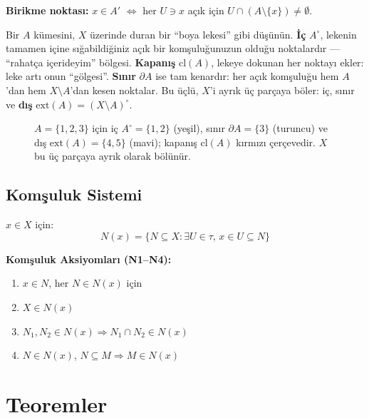 \noindent\textbf{Birikme noktası:} $x \in A'$ $\iff$ her $U \ni x$ açık için
$U \cap (A \setminus \{x\}) \neq \emptyset$.

\begin{sezgi}
Bir $A$ kümesini, $X$ üzerinde duran bir ``boya lekesi'' gibi düşünün.
\textbf{İç} $A^\circ$, lekenin tamamen içine sığabildiğiniz açık bir
komşuluğunuzun olduğu noktalardır --- ``rahatça içerideyim'' bölgesi.
\textbf{Kapanış} $\mathrm{cl}(A)$, lekeye dokunan her noktayı ekler:
leke artı onun ``gölgesi''. \textbf{Sınır} $\partial A$ ise tam kenardır:
her açık komşuluğu hem $A$'dan hem $X\setminus A$'dan kesen noktalar.
Bu üçlü, $X$'i ayrık üç parçaya böler: iç, sınır ve \textbf{dış}
$\mathrm{ext}(A) = (X\setminus A)^\circ$.
\end{sezgi}

\begin{figure}[ht]
  \centering
  
  \caption{$A=\{1,2,3\}$ için iç $A^\circ=\{1,2\}$ (yeşil), sınır
    $\partial A=\{3\}$ (turuncu) ve dış $\mathrm{ext}(A)=\{4,5\}$ (mavi);
    kapanış $\mathrm{cl}(A)$ kırmızı çerçevedir. $X$ bu üç parçaya ayrık olarak bölünür.}
  \label{fig:ch05:ic_kapanis_sinir}
\end{figure}

\subsection{Komşuluk Sistemi}

\begin{definition}
$x \in X$ için:
\[
  N(x) = \{N \subseteq X : \exists U \in \tau,\, x \in U \subseteq N\}
\]
\end{definition}

\noindent\textbf{Komşuluk Aksiyomları (N1--N4):}
\begin{enumerate}
  \item[(N1)] $x \in N$, her $N \in N(x)$ için
  \item[(N2)] $X \in N(x)$
  \item[(N3)] $N_1, N_2 \in N(x) \Rightarrow N_1 \cap N_2 \in N(x)$
  \item[(N4)] $N \in N(x)$, $N \subseteq M \Rightarrow M \in N(x)$
\end{enumerate}

\section{Teoremler}

